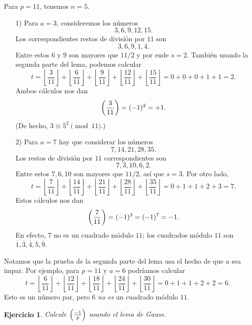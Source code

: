 \documentclass{article}
\theoremstyle{plain}
\newtheorem{ejerc}{Ejercicio}
\begin{document}
\begin{ejemplo}
  Para $p = 11$, tenemos $n = 5$.

  \begin{enumerate}
  \item[1)] Para $a = 3$, consideremos los números
    $$3, 6, 9, 12, 15.$$
    Los correspondientes restos de división por $11$ son
    $$3, 6, 9, 1, 4.$$
    Entre estos $6$ y $9$ son mayores que $11/2$ y por ende $s = 2$. También
    usando la segunda parte del lema, podemos calcular
    $$t = \left\lfloor\frac{3}{11}\right\rfloor + \left\lfloor\frac{6}{11}\right\rfloor + \left\lfloor\frac{9}{11}\right\rfloor + \left\lfloor\frac{12}{11}\right\rfloor + \left\lfloor\frac{15}{11}\right\rfloor = 0 + 0 + 0 + 1 + 1 = 2.$$
    Ambos cálculos nos dan
    $$\left(\frac{3}{11}\right) = (-1)^2 = +1.$$
    (De hecho, $3 \equiv 5^2 \pmod{11}$.)

  \item[2)] Para $a = 7$ hay que considerar los números
    $$7, 14, 21, 28, 35.$$
    Los restos de división por $11$ correspondientes son
    $$7, 3, 10, 6, 2.$$
    Entre estos $7,6,10$ son mayores que $11/2$, así que $s = 3$. Por otro lado,
    $$t = \left\lfloor\frac{7}{11}\right\rfloor + \left\lfloor\frac{14}{11}\right\rfloor + \left\lfloor\frac{21}{11}\right\rfloor + \left\lfloor\frac{28}{11}\right\rfloor + \left\lfloor\frac{35}{11}\right\rfloor = 0 + 1 + 1 + 2 + 3 = 7.$$
    Estos cálculos nos dan
    $$\left(\frac{7}{11}\right) = (-1)^3 = (-1)^7 = -1.$$
    En efecto, $7$ no es un cuadrado módulo $11$; los cuadrados módulo $11$ son
    $\overline{1},\overline{3},\overline{4},\overline{5},\overline{9}$. \qedhere
  \end{enumerate}
\end{ejemplo}

\begin{ejemplo}
  Notamos que la prueba de la segunda parte del lema usa el hecho de que $a$ sea
  impar. Por ejemplo, para $p = 11$ y $a = 6$ podríamos calcular
  $$t = \left\lfloor\frac{6}{11}\right\rfloor + \left\lfloor\frac{12}{11}\right\rfloor + \left\lfloor\frac{18}{11}\right\rfloor + \left\lfloor\frac{24}{11}\right\rfloor + \left\lfloor\frac{30}{11}\right\rfloor = 0 + 1 + 1 + 2 + 2  = 6.$$
  Esto es un número par, pero $6$ \emph{no es} un cuadrado módulo $11$.
\end{ejemplo}

\begin{ejerc}
  Calcule $\left(\frac{-1}{p}\right)$ usando el lema de Gauss.
\end{ejerc}
\end{document}
